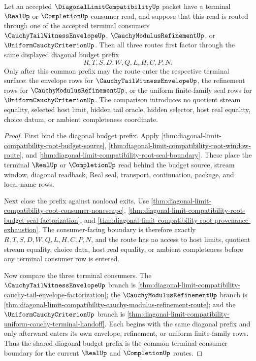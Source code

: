 \begin{theorem}
\label{thm:diagonal-limit-compatibility-uniform-cauchy-three-way-terminal-comparison}
Let an accepted $\DiagonalLimitCompatibilityUp$ packet have a terminal
$\RealUp$ or $\CompletionUp$ consumer read, and suppose that this read is routed
through one of the accepted terminal consumers $\CauchyTailWitnessEnvelopeUp$,
$\CauchyModulusRefinementUp$, or $\UniformCauchyCriterionUp$. Then all three
routes first factor through the same displayed diagonal budget prefix
$$
R,T,S,D,W,Q,L,H,C,P,N.
$$
Only after this common prefix may the route enter the respective terminal
surface: the envelope rows for $\CauchyTailWitnessEnvelopeUp$, the refinement
rows for $\CauchyModulusRefinementUp$, or the uniform finite-family seal rows
for $\UniformCauchyCriterionUp$. The comparison introduces no quotient stream
equality, selected host limit, hidden tail oracle, hidden selector, host real
equality, choice datum, or ambient completeness coordinate.
\end{theorem}
\begin{proof}
First bind the diagonal budget prefix. Apply
\autoref{thm:diagonal-limit-compatibility-root-budget-source},
\autoref{thm:diagonal-limit-compatibility-root-window-route}, and
\autoref{thm:diagonal-limit-compatibility-root-seal-boundary}. These place the
terminal $\RealUp$ or $\CompletionUp$ read behind the budget source, stream
window, diagonal readback, Real seal, transport, continuation, package, and
local-name rows.

Next close the prefix against nonlocal exits. Use
\autoref{thm:diagonal-limit-compatibility-root-consumer-nonescape},
\autoref{thm:diagonal-limit-compatibility-root-budget-seal-factorization}, and
\autoref{thm:diagonal-limit-compatibility-root-provenance-exhaustion}. The
consumer-facing boundary is therefore exactly $R,T,S,D,W,Q,L,H,C,P,N$, and the
route has no access to host limits, quotient stream equality, choice data, host
real equality, or ambient completeness before any terminal consumer row is
entered.

Now compare the three terminal consumers. The
$\CauchyTailWitnessEnvelopeUp$ branch is
\autoref{thm:diagonal-limit-compatibility-cauchy-tail-envelope-factorization};
the $\CauchyModulusRefinementUp$ branch is
\autoref{thm:diagonal-limit-compatibility-cauchy-modulus-refinement-route}; and
the $\UniformCauchyCriterionUp$ branch is
\autoref{thm:diagonal-limit-compatibility-uniform-cauchy-terminal-handoff}.
Each begins with the same diagonal prefix and only afterward enters its own
envelope, refinement, or uniform finite-family rows. Thus the shared diagonal
budget prefix is the common terminal-consumer boundary for the current
$\RealUp$ and $\CompletionUp$ routes.
\end{proof}

